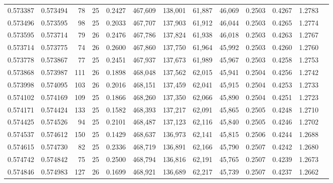 \begin{tabular}{rrrrrrrrrrrrr}
0.573387 & 0.573494 &  78 &  25 &                                     0.2427 & 467,609 & 138,001 &  61,887 &  46,069 & 0.2503 & 0.4267 & 1.2783 \\
0.573496 & 0.573595 &  98 &  25 &                                     0.2033 & 467,707 & 137,903 &  61,912 &  46,044 & 0.2503 & 0.4265 & 1.2774 \\
0.573595 & 0.573714 &  79 &  26 &                                     0.2476 & 467,786 & 137,824 &  61,938 &  46,018 & 0.2503 & 0.4263 & 1.2767 \\
0.573714 & 0.573775 &  74 &  26 &                                     0.2600 & 467,860 & 137,750 &  61,964 &  45,992 & 0.2503 & 0.4260 & 1.2760 \\
0.573778 & 0.573867 &  77 &  25 &                                     0.2451 & 467,937 & 137,673 &  61,989 &  45,967 & 0.2503 & 0.4258 & 1.2753 \\
0.573868 & 0.573987 & 111 &  26 &                                     0.1898 & 468,048 & 137,562 &  62,015 &  45,941 & 0.2504 & 0.4256 & 1.2742 \\
0.573998 & 0.574095 & 103 &  26 &                                     0.2016 & 468,151 & 137,459 &  62,041 &  45,915 & 0.2504 & 0.4253 & 1.2733 \\
0.574102 & 0.574169 & 109 &  25 &                                     0.1866 & 468,260 & 137,350 &  62,066 &  45,890 & 0.2504 & 0.4251 & 1.2723 \\
0.574171 & 0.574424 & 133 &  25 &                                     0.1582 & 468,393 & 137,217 &  62,091 &  45,865 & 0.2505 & 0.4248 & 1.2710 \\
0.574425 & 0.574526 &  94 &  25 &                                     0.2101 & 468,487 & 137,123 &  62,116 &  45,840 & 0.2505 & 0.4246 & 1.2702 \\
0.574537 & 0.574612 & 150 &  25 &                                     0.1429 & 468,637 & 136,973 &  62,141 &  45,815 & 0.2506 & 0.4244 & 1.2688 \\
0.574615 & 0.574730 &  82 &  25 &                                     0.2336 & 468,719 & 136,891 &  62,166 &  45,790 & 0.2507 & 0.4242 & 1.2680 \\
0.574742 & 0.574842 &  75 &  25 &                                     0.2500 & 468,794 & 136,816 &  62,191 &  45,765 & 0.2507 & 0.4239 & 1.2673 \\
0.574846 & 0.574983 & 127 &  26 &                                     0.1699 & 468,921 & 136,689 &  62,217 &  45,739 & 0.2507 & 0.4237 & 1.2662 \\

\end{tabular}
